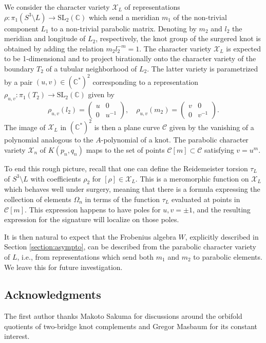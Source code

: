 \documentclass{amsart}
\newcommand{\C}{\mathbb{C}}
\newcommand{\SL}{\mathrm{SL}}
\newcommand{\calC}{\mathcal{C}}
\newcommand{\calX}{\mathcal{X}}
\theoremstyle{definition}
\begin{document}
We consider the character variety $\calX_L$ of representations $\rho:\pi_1(S^3\setminus L)\to \SL_2(\C)$ which send a meridian $m_1$ of the non-trivial component $L_1$ to a non-trivial parabolic matrix. Denoting by $m_2$ and $l_2$ the meridian and longitude of $L_2$, respectively, the knot group of the surgered knot is obtained by adding the relation $m_2l_2^{-m}=1$. 
The character variety $\calX_L$ is expected to be 1-dimensional and to project birationally onto the character variety of the boundary $T_2$ of a tubular neighborhood of $L_2$. The latter variety is parametrized by a pair $(u,v)\in (\C^*)^2$ corresponding to a representation $\rho_{u,v}:\pi_1(T_2)\to \SL_2(\C)$ given by 
$$\rho_{u,v}(l_2)=\begin{pmatrix}u & 0 \\ 0 & u^{-1}\end{pmatrix},\quad \rho_{u,v}(m_2)=\begin{pmatrix}v & 0 \\ 0 & v^{-1}\end{pmatrix}.$$
The image of $\calX_L$ in $(\C^*)^2$ is then a plane curve $\calC$ given by the vanishing of a polynomial analogous to the $A$-polynomial of a knot. The parabolic character variety $\calX_n$ of $K(p_n,q_n)$ maps to the set of points $\calC[m] \subset \calC$ satisfying $v=u^m$. 





To end this rough picture, recall that one can define the Reidemeister torsion $\tau_L$ of $S^3\setminus L$ with coefficients $\rho_2$ for $[\rho]\in \calX_L$. This is a meromorphic function on $\calX_L$ which behaves well under surgery, meaning that there is a formula expressing the collection of elements $\Omega_n$ in terms of the function $\tau_L$ evaluated at points in $\calC[m]$. This expression happens to have poles for $u,v=\pm 1$, and the resulting expression for the signature will localize on those poles. 

It is then natural to expect that the Frobenius algebra $W$, explicitly described in Section \ref{section:asympto}, can be described from the parabolic character variety of $L$, i.e., from representations which send both $m_1$ and $m_2$ to parabolic elements. We leave this for future investigation. 

\subsection*{Acknowledgments}
The first author thanks Makoto Sakuma for discussions around the orbifold quotients of two-bridge knot complements and Gregor Masbaum for its constant interest. 
\end{document}
